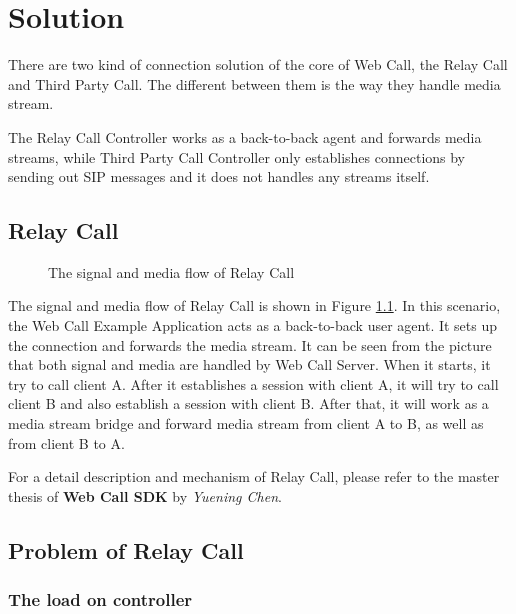 \chapter{Solution}
\label{sec:Solution}

There are two kind of connection solution of the core of Web Call, the Relay Call and Third Party Call. The different between them is the way they handle media stream.

The Relay Call Controller works as a back-to-back agent and forwards media streams, while Third Party Call Controller only establishes connections by sending out SIP messages and it does not handles any streams itself. 

\section{Relay Call}
\label{sec:Solution:RelayCall}

\begin{figure}[!hbtp]
\centering
{}
\caption{The signal and media flow of Relay Call}
\label{fig:TheSignalAndMediaFlowOfRelayCall}
\end{figure}

The signal and media flow of Relay Call is shown in Figure \ref{fig:TheSignalAndMediaFlowOfRelayCall}. In this scenario, the Web Call Example Application acts as a back-to-back user agent. It sets up the connection and forwards the media stream. It can be seen from the picture that both signal and media are handled by Web Call Server. When it starts, it try to call client A. After it establishes a session with client A, it will try to call client B and also establish a session with client B. After that, it will work as a media stream bridge and forward media stream from client A to B, as well as from client B to A.

For a detail description and mechanism of Relay Call, please refer to the master thesis of \textbf{Web Call SDK} by \textit{Yuening Chen}\cite{WebCallSDK}.

\section{Problem of Relay Call}
\label{}

\subsection{The load on controller}
 
